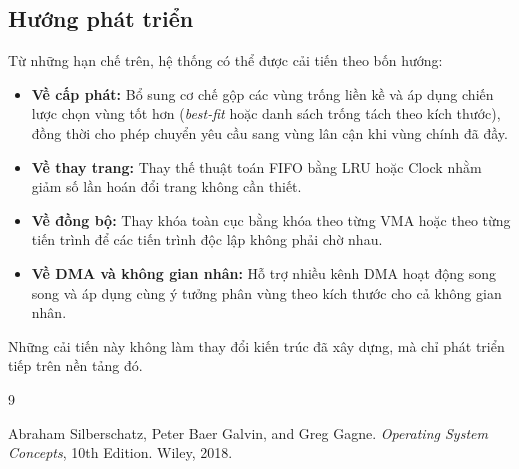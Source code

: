 \documentclass[12pt,a4paper]{article}
\begin{document}
    \subsection*{Hướng phát triển}
    
    Từ những hạn chế trên, hệ thống có thể được cải tiến theo bốn hướng:
    \begin{itemize}
        \item \textbf{Về cấp phát:} Bổ sung cơ chế gộp các vùng trống liền kề và áp dụng chiến lược chọn vùng tốt hơn (\textit{best-fit} hoặc danh sách trống tách theo kích thước), đồng thời cho phép chuyển yêu cầu sang vùng lân cận khi vùng chính đã đầy.
        \item \textbf{Về thay trang:} Thay thế thuật toán FIFO bằng LRU hoặc Clock nhằm giảm số lần hoán đổi trang không cần thiết.
        \item \textbf{Về đồng bộ:} Thay khóa toàn cục bằng khóa theo từng VMA hoặc theo từng tiến trình để các tiến trình độc lập không phải chờ nhau.
        \item \textbf{Về DMA và không gian nhân:} Hỗ trợ nhiều kênh DMA hoạt động song song và áp dụng cùng ý tưởng phân vùng theo kích thước cho cả không gian nhân.
    \end{itemize}
    
    Những cải tiến này không làm thay đổi kiến trúc đã xây dựng, mà chỉ phát triển tiếp trên nền tảng đó.

	\begin{thebibliography}{9}

	Abraham Silberschatz, Peter Baer Galvin, and Greg Gagne.
	\newblock \textit{Operating System Concepts}, 10th Edition.
	\newblock Wiley, 2018.

	\end{thebibliography}
\end{document}
